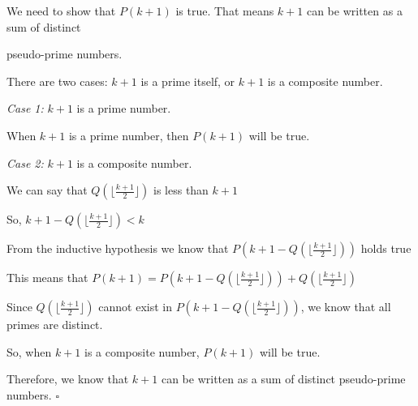 \documentclass{article} %
\begin{document}
    We need to show that $P(k + 1)$ is true. That means $k + 1$ can be written as a sum of distinct 
    
    pseudo-prime numbers.

    There are two cases: $k + 1$ is a prime itself, or $k + 1$ is a composite number.

    \textit{Case 1:} $k + 1$ is a prime number.

    \tabto{1cm} When $k + 1$ is a prime number, then $P(k + 1)$ will be true.

    \textit{Case 2:} $k + 1$ is a composite number.

    \tabto{1cm} We can say that $Q(\lfloor \frac{k + 1}{2} \rfloor)$ is less than $k + 1$

    \tabto{1cm} So, $k + 1 - Q(\lfloor \frac{k + 1}{2} \rfloor) < k$

    \vspace*{0.1cm}
    
    \tabto{1cm} From the inductive hypothesis we know that $P(k + 1 - Q(\lfloor \frac{k + 1}{2} \rfloor))$ holds true
    \vspace*{0.1cm}

    \tabto{1cm} This means that $P(k + 1) = P(k + 1 - Q(\lfloor \frac{k + 1}{2} \rfloor)) + Q(\lfloor \frac{k + 1}{2} \rfloor)$
    \vspace*{0.1cm}

    \tabto{1cm} Since $Q(\lfloor \frac{k + 1}{2} \rfloor)$ cannot exist in $P(k + 1 - Q(\lfloor \frac{k + 1}{2} \rfloor))$, we know that all primes are distinct.
    \vspace*{0.1cm}

    \tabto{1cm} So, when $k + 1$ is a composite number, $P(k + 1)$ will be true.
    
    Therefore, we know that $k + 1$ can be written as a sum of distinct pseudo-prime numbers. $\square$
\end{document}
